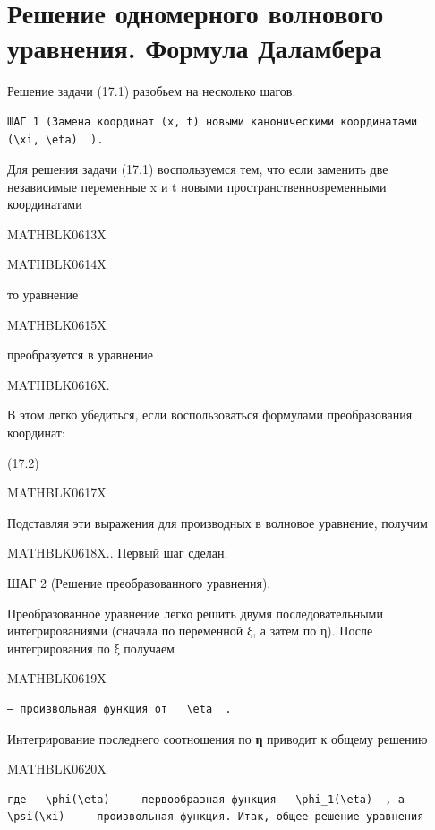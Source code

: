 \documentclass[
]{article}
\begin{document}
{{\section{Решение одномерного волнового уравнения. Формула
Даламбера}\label{ux440ux435ux448ux435ux43dux438ux435-ux43eux434ux43dux43eux43cux435ux440ux43dux43eux433ux43e-ux432ux43eux43bux43dux43eux432ux43eux433ux43e-ux443ux440ux430ux432ux43dux435ux43dux438ux44f.-ux444ux43eux440ux43cux443ux43bux430-ux434ux430ux43bux430ux43cux431ux435ux440ux430}

Решение задачи (17.1) разобьем на несколько шагов:

\begin{verbatim}
ШАГ 1 (Замена координат (x, t) новыми каноническими координатами   (\xi, \eta)  ).
\end{verbatim}

Для решения задачи (17.1) воспользуемся тем, что если заменить две
независимые переменные x и t новыми пространственновременными
координатами

MATHBLK0613X

MATHBLK0614X

то уравнение

MATHBLK0615X

преобразуется в уравнение

MATHBLK0616X.

В этом легко убедиться, если воспользоваться формулами преобразования
координат:

(17.2)

MATHBLK0617X

Подставляя эти выражения для производных в волновое уравнение, получим

MATHBLK0618X.. Первый шаг сделан.

ШАГ 2 (Решение преобразованного уравнения).

Преобразованное уравнение легко решить двумя последовательными
интегрированиями (сначала по переменной ξ, а затем по η). После
интегрирования по ξ получаем

MATHBLK0619X

\begin{verbatim}
— произвольная функция от   \eta  .
\end{verbatim}

Интегрирование последнего соотношения по \textbf{η} приводит к общему
решению

MATHBLK0620X

\begin{verbatim}
где   \phi(\eta)   — первообразная функция   \phi_1(\eta)  , а   \psi(\xi)   — произвольная функция. Итак, общее решение уравнения
\end{verbatim}

}}
\end{document}
